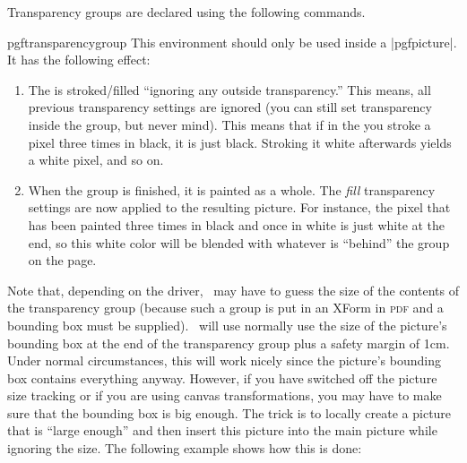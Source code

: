 Transparency groups are declared using the following commands.

\begin{environment}{{pgftransparencygroup}}
  This environment should only be used inside a |{pgfpicture}|. It has
  the following effect:
  \begin{enumerate}
  \item The  is stroked/filled
    ``ignoring any outside transparency.'' This means, all previous
    transparency settings are ignored (you can still set transparency
    inside the group, but never mind). This means that if in the
     you stroke a pixel three times in
    black, it is just black. Stroking it white afterwards yields a
    white pixel, and so on.
  \item When the group is finished, it is painted as a whole. The
    \emph{fill} transparency settings are now applied to the resulting
    picture. For instance, the pixel that has been painted three times
    in black and once in white is just white at the end, so this white
    color will be blended with whatever is ``behind'' the group on the
    page.
  \end{enumerate}

  Note that, depending on the driver, \pgfname\ may have to guess the
  size of the contents of the transparency group (because such a group
  is put in an XForm in \textsc{pdf} and a bounding box must be
  supplied). \pgfname\ will use normally use the size of the picture's
  bounding box at the end of the transparency group plus a safety
  margin of 1cm. Under normal circumstances, this will work nicely
  since the picture's bounding box contains everything
  anyway. However, if you have switched off the picture size tracking
  or if you are using canvas transformations, you may have to make
  sure that the bounding box is big enough. The trick is to locally
  create a picture that is ``large enough'' and then insert this
  picture into the main picture while ignoring the size. The following
  example shows how this is done:


{\tikzexternaldisable
{}
}%



\end{environment}

